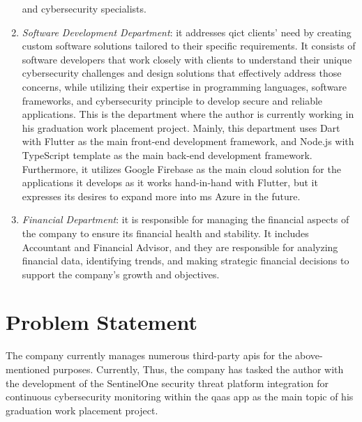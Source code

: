 \begin{multicols}{2}
\begin{enumerate}
                  and cybersecurity specialists.
            \item \textit{Software Development Department}: it addresses \acrshort{qict} clients' need by creating
                  custom software solutions tailored to their specific requirements. It consists of software
                  developers that work closely with clients to understand their unique cybersecurity challenges and
                  design solutions that effectively address those concerns, while utilizing their expertise in
                  programming languages, software frameworks, and cybersecurity principle to develop secure and
                  reliable applications. This is the department where the author is currently working in his
                  graduation work placement project. Mainly, this department uses Dart with Flutter as the main
                  front-end development framework, and Node.js with TypeScript template as the main back-end
                  development framework. Furthermore, it utilizes Google Firebase as the  main cloud solution for
                  the applications it develops as it works hand-in-hand with Flutter, but it expresses its
                  desires to expand more into \acrshort{ms} Azure in the future.
            \item \textit{Financial Department}: it is responsible for managing the financial aspects of the company
                  to ensure its financial health and stability. It includes Accountant and Financial Advisor, and
                  they are responsible for analyzing financial data, identifying trends, and making strategic
                  financial decisions to support the company's growth and objectives.
      \end{enumerate}
      \section{Problem Statement}
      The company currently manages numerous third-party \acrshort{api}s for the above-mentioned purposes.
      Currently,
      Thus, the company has tasked the author with the development of the SentinelOne security threat platform integration
      for continuous cybersecurity monitoring within the \acrshort{qaas} app as the main topic of his graduation work placement
      project.


\end{multicols}

